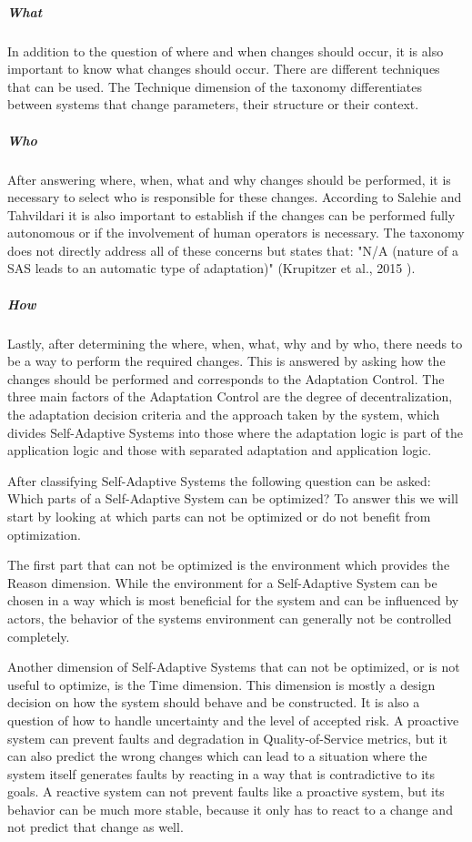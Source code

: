 \subparagraph*{What}
In addition to the question of where and when changes should occur, it is also important to know
what changes should occur. There are different techniques that can be used.
The Technique dimension of the taxonomy differentiates between systems that change parameters, their structure or their context.

\subparagraph*{Who}
After answering where, when, what and why changes should be performed, 
it is necessary to select who is responsible for these changes.
According to Salehie and Tahvildari it is also important to establish if the changes can be performed fully autonomous
or if the involvement of human operators is necessary.
The taxonomy does not directly address all of these concerns but states that:
"N/A (nature of a SAS leads to an automatic type of adaptation)" (Krupitzer et al., 2015 \cite{SurveyOnEngineeringApproaches}).

\subparagraph*{How}
Lastly, after determining the where, when, what, why and by who, there needs to be a way
to perform the required changes. This is answered by asking how the changes should be performed
and corresponds to the Adaptation Control.
The three main factors of the Adaptation Control are the degree of decentralization, the adaptation decision criteria
and the approach taken by the system, which divides Self-Adaptive Systems into those where the adaptation logic is part of the application logic
and those with separated adaptation and application logic.
\newline
\par


After classifying Self-Adaptive Systems the following question can be asked: Which parts of a Self-Adaptive System can be optimized?
To answer this we will start by looking at which parts can not be optimized or do not benefit from optimization.
\newline
\par

The first part that can not be optimized is the environment which provides the Reason dimension.
While the environment for a Self-Adaptive System can be chosen in a way which is most beneficial for the system
and can be influenced by actors,
the behavior of the systems environment can generally not be controlled completely.
\newline
\par

Another dimension of Self-Adaptive Systems that can not be optimized, or is not useful to optimize,
is the Time dimension. This dimension is mostly a design decision on how the system should behave and be constructed.
It is also a question of how to handle uncertainty and the level of accepted risk.
A proactive system can prevent faults and degradation in Quality-of-Service metrics,
but it can also predict the wrong changes which can lead to a situation where the system itself generates faults by
reacting in a way that is contradictive to its goals.
A reactive system can not prevent faults like a proactive system,
but its behavior can be much more stable, because it only has to react to a change and not predict that change as well.
\newline
\par

